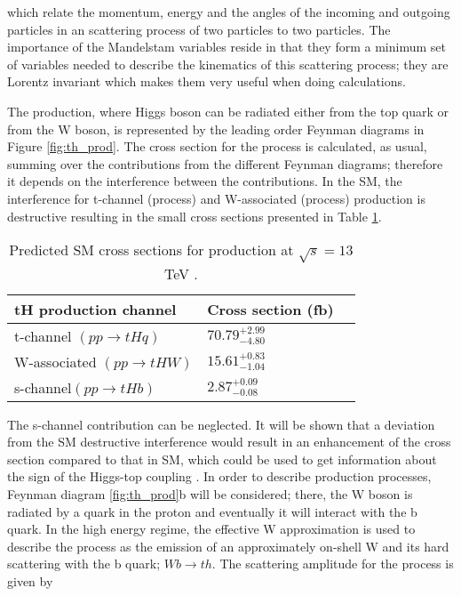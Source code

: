 \noindent which relate the momentum, energy and the angles of the incoming and outgoing particles in an scattering process of two particles to two particles. The importance of the Mandelstam variables reside in that they form a minimum set of variables needed to describe the kinematics of this scattering process; they are Lorentz invariant which makes them very useful when doing calculations.      

The \tH production, where Higgs boson can be radiated either from the top quark or from the W boson, is represented by the leading order Feynman diagrams in Figure \ref{fig:th_prod}. The cross section for the \tH process is calculated, as usual, summing over the contributions from the different Feynman diagrams; therefore it depends on the interference between the contributions. In the SM, the interference for t-channel (\tHq process)  and W-associated (\tHW process) production is destructive \cite{maltoni1} resulting in the small cross sections presented in Table \ref{tab:th_xsec}. 

\begin{table}[h]
\centering
\begin{tabular}{lll}\hline
tH production channel       & Cross section (fb)      \\\hline
t-channel $(pp \to tHq)$    & $70.79^{+2.99}_{-4.80}$ \\
W-associated $(pp \to tHW)$ & $15.61^{+0.83}_{-1.04}$ \\
s-channel$(pp \to tHb)$     & $ 2.87^{+0.09}_{-0.08}$ \\\hline
\end{tabular}
\caption[Predicted SM cross sections for \tH production at $\sqrt{s}=13$ TeV.]{Predicted SM cross sections for \tH production at $\sqrt{s}=13$ TeV \cite{thqw_xsec, thb_xsec}.}\label{tab:th_xsec}
\end{table}

The s-channel contribution can be neglected. It will be shown that a deviation from the SM destructive interference would result in an enhancement of the \tH cross section compared to that in SM, which could be used to get information about the sign of the Higgs-top coupling \cite{farina,tait}. In order to describe \tH production processes, Feynman diagram \ref{fig:th_prod}b will be considered; there, the W boson is radiated by a quark in the proton and eventually it will interact with the b quark. In the high energy regime, the effective W approximation \cite{dawson} is used to describe the process as the emission of an approximately on-shell W and its hard scattering with the b quark; \ie $Wb \to th$. The scattering amplitude for the process is given by

